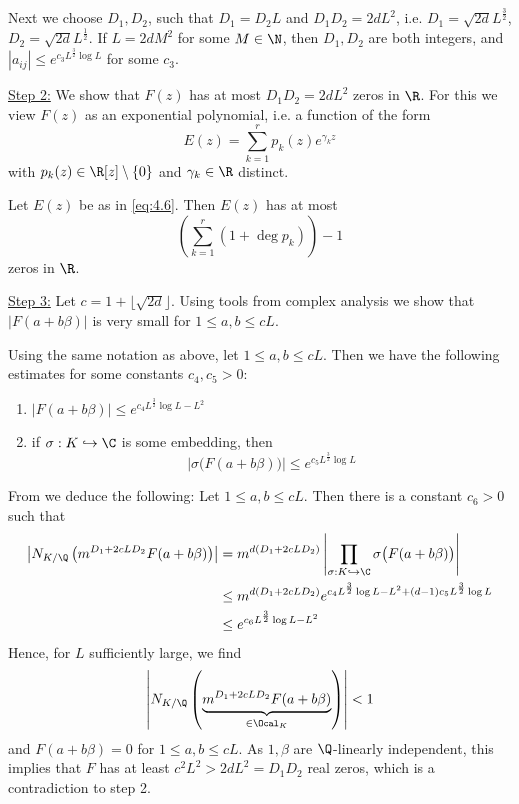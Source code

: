 Next we choose \( D_1, D_2 \), such that \( D_1 = D_2L \) and \( D_1D_2 = 2dL^2 \), i.e. \( D_1 = \sqrt{2d}L^\frac{3}{2} \), \( D_2 = \sqrt{2d}L^\frac{1}{2} \).
If \( L = 2dM^2 \) for some \( M \in \N \), then \( D_1, D_2 \) are both integers, and \( |a_{ij}| \leq e^{c_3 L^\frac{3}{2} \log L} \) for some \( c_3 \).

\underline{Step 2:} We show that \( F(z) \) has at most \( D_1D_2 = 2dL^2 \) zeros in \( \R \).
For this we view \( F(z) \) as an exponential polynomial, i.e. a function of the form
\begin{equation}\label{eq:4.6}
	E(z) = \sum_{k=1}^{r} p_k(z) e^{\gamma_k z}
\end{equation}
with \( p_k(z) \in \R[z] \setminus \{0\} \) and \( \gamma_k \in \R \) distinct.

\begin{lem}
	Let \( E(z) \) be as in \eqref{eq:4.6}.
	Then \( E(z) \) has at most
	\[ \left( \sum_{k=1}^{r} (1+\deg p_k) \right) -1 \]
	zeros in \( \R \).
\end{lem}

\underline{Step 3:} Let \( c=1 + \lfloor \sqrt{2d} \rfloor \).
Using tools from complex analysis we show that \( |F(a+b\beta)| \) is very small for \( 1 \leq a,b \leq cL \).

\begin{lem}\label{thm:4.40}
	Using the same notation as above, let \( 1 \leq a,b \leq cL \).
	Then we have the following estimates for some constants \( c_4, c_5 > 0 \):
	\begin{enumerate}[label=(\roman*)]
		\item \( |F(a+b\beta)| \leq e^{c_4 L^\frac{3}{2} \log L - L^2} \)
		\item if \( \sigma: K \hookrightarrow \C \) is some embedding, then
			\[ \left| \sigma\big( F(a+b\beta) \big) \right| \leq e^{c_5 L^\frac{3}{2} \log L} \]
	\end{enumerate}
\end{lem}

From  we deduce the following:
Let \( 1 \leq a, b \leq cL \).
Then there is a constant \( c_6 > 0 \) such that
\begin{align*}
	\left| N_{K/\Q} \left( m^{D_1 + 2cLD_2} F(a+b\beta) \right) \right| &= m^{d(D_1 + 2cLD_2)} \left| \prod_{\sigma: K \hookrightarrow \C} \sigma\big( F(a+b\beta) \big) \right|\\
	&\leq m^{d(D_1 + 2cLD_2)} e^{c_4 L^\frac{3}{2} \log L - L^2 + (d-1)c_5 L^\frac{3}{2} \log L}\\
	&\leq e^{c_6 L^\frac{3}{2} \log L - L^2}
\end{align*}
Hence, for \( L \) sufficiently large, we find
\[ \left| N_{K/\Q} \left(\underbrace{m^{D_1 + 2cLD_2} F(a+b\beta)}_{\in \Ocal_K}\right) \right| < 1 \]
and \( F(a+b\beta) = 0 \) for \( 1 \leq a,b \leq cL \).
As \( 1,\beta \) are \( \Q \)-linearly independent, this implies that \( F \) has at least \( c^2L^2 > 2dL^2 = D_1D_2 \) real zeros, which is a contradiction to step 2.